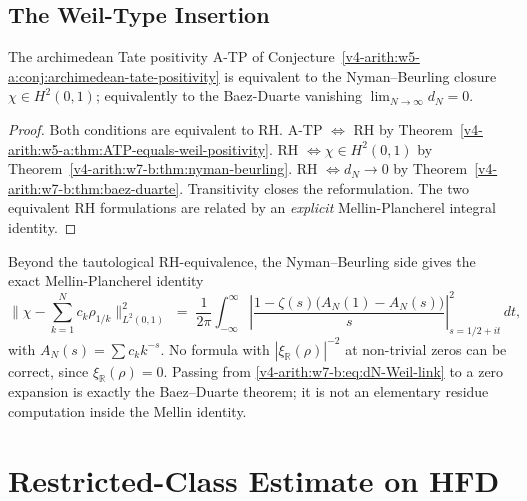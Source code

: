 \subsection{The Weil-Type Insertion}
\label{v4-arith:w7-b:mellin-translation:weil-insertion}

\begin{theorem}
\label{v4-arith:w7-b:thm:translation-ATP-NB}
The archimedean Tate positivity A-TP of
Conjecture~\ref{v4-arith:w5-a:conj:archimedean-tate-positivity} is equivalent
to the Nyman--Beurling closure \(\chi\in H^{2}(0,1)\); equivalently to
the Baez-Duarte vanishing \(\lim_{N\to\infty}d_{N}=0\).
\end{theorem}

\begin{proof}
Both conditions are equivalent to RH. A-TP
\(\Leftrightarrow\) RH by
Theorem~\ref{v4-arith:w5-a:thm:ATP-equals-weil-positivity}. RH
\(\Leftrightarrow\chi\in H^{2}(0,1)\) by
Theorem~\ref{v4-arith:w7-b:thm:nyman-beurling}. RH
\(\Leftrightarrow d_{N}\to 0\) by
Theorem~\ref{v4-arith:w7-b:thm:baez-duarte}. Transitivity closes the
reformulation. The two equivalent RH formulations are related by an
\emph{explicit} Mellin-Plancherel integral identity.
\end{proof}

\begin{remark}
\label{v4-arith:w7-b:rem:cross-reduction}
Beyond the tautological RH-equivalence, the Nyman--Beurling side gives
the exact Mellin-Plancherel identity
\begin{equation}
\label{v4-arith:w7-b:eq:dN-Weil-link}
\|\chi-\sum_{k=1}^{N}c_{k}\rho_{1/k}\|_{L^{2}(0,1)}^{2}
\;=\;\frac{1}{2\pi}\int_{-\infty}^{\infty}\left|
\frac{1-\zeta(s)\bigl(A_N(1)-A_N(s)\bigr)}{s}
\right|_{s=1/2+it}^{2}\,dt,
\end{equation}
with \(A_N(s)=\sum c_k k^{-s}\). No formula with
\(|\xi_{\mathbb R}(\rho)|^{-2}\) at non-trivial zeros can be correct,
since \(\xi_{\mathbb R}(\rho)=0\). Passing from
\eqref{v4-arith:w7-b:eq:dN-Weil-link} to a zero expansion is exactly the
Baez--Duarte theorem; it is not an elementary residue computation inside
the Mellin identity.
\end{remark}

\section{Restricted-Class Estimate on HFD}
\label{v4-arith:w7-b:restricted-class}

